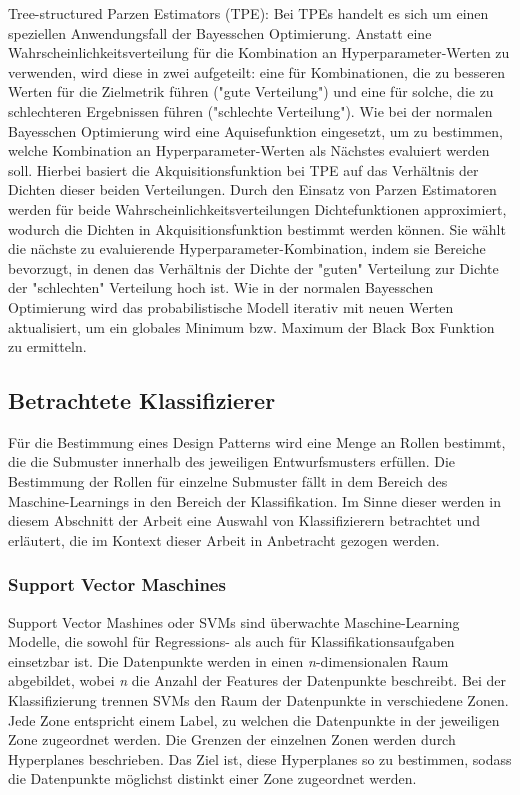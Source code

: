 \begin{description}
    \item Tree-structured Parzen Estimators (TPE): Bei TPEs handelt es sich um einen speziellen Anwendungsfall der Bayesschen Optimierung. Anstatt eine Wahrscheinlichkeitsverteilung für die Kombination an Hyperparameter-Werten zu verwenden, wird diese in zwei aufgeteilt:
    eine für Kombinationen, die zu besseren Werten für die Zielmetrik führen ("gute Verteilung") und eine für solche, die zu schlechteren Ergebnissen führen ("schlechte Verteilung"). Wie bei der normalen Bayesschen Optimierung wird eine Aquisefunktion eingesetzt, um zu bestimmen, welche Kombination an Hyperparameter-Werten als Nächstes evaluiert werden soll.
    Hierbei basiert die Akquisitionsfunktion bei TPE auf das Verhältnis der Dichten dieser beiden Verteilungen. Durch den Einsatz von Parzen Estimatoren werden für beide Wahrscheinlichkeitsverteilungen Dichtefunktionen approximiert, wodurch die Dichten in Akquisitionsfunktion bestimmt werden können.
    Sie wählt die nächste zu evaluierende Hyperparameter-Kombination, indem sie Bereiche bevorzugt, in denen das Verhältnis der Dichte der "guten" Verteilung zur Dichte der "schlechten" Verteilung hoch ist.
    Wie in der normalen Bayesschen Optimierung wird das probabilistische Modell iterativ mit neuen Werten aktualisiert, um ein globales Minimum bzw. Maximum der Black Box Funktion zu ermitteln.

\end{description}

\pagebreak

\subsection{Betrachtete Klassifizierer}
Für die Bestimmung eines Design Patterns wird eine Menge an Rollen bestimmt, die die Submuster innerhalb des jeweiligen Entwurfsmusters erfüllen.
Die Bestimmung der Rollen für einzelne Submuster fällt in dem Bereich des Maschine-Learnings in den Bereich der Klassifikation. Im Sinne dieser werden in diesem Abschnitt der Arbeit eine Auswahl von Klassifizierern betrachtet und erläutert,
die im Kontext dieser Arbeit in Anbetracht gezogen werden.

\subsubsection*{Support Vector Maschines}

Support Vector Mashines oder SVMs sind überwachte Maschine-Learning Modelle, die sowohl für Regressions- als auch für Klassifikationsaufgaben einsetzbar ist. Die Datenpunkte werden in einen \textit{n}-dimensionalen Raum abgebildet, wobei \textit{n} die Anzahl der Features der Datenpunkte beschreibt.
Bei der Klassifizierung trennen SVMs den Raum der Datenpunkte in verschiedene Zonen. Jede Zone entspricht einem Label, zu welchen die Datenpunkte in der jeweiligen Zone zugeordnet werden. Die Grenzen der einzelnen Zonen werden durch Hyperplanes beschrieben. Das Ziel ist, diese Hyperplanes so zu bestimmen,
sodass die Datenpunkte möglichst distinkt einer Zone zugeordnet werden.


